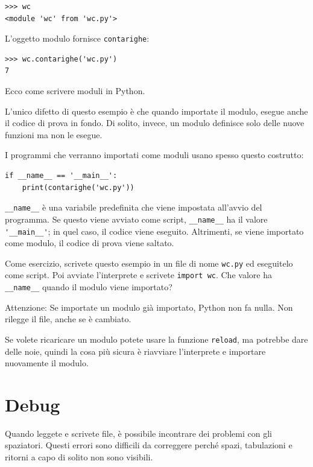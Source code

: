 \documentclass[10pt]{book}
\begin{document}
\begin{verbatim}
>>> wc
<module 'wc' from 'wc.py'>
\end{verbatim}
%
L'oggetto modulo fornisce \verb"contarighe":

\begin{verbatim}
>>> wc.contarighe('wc.py')
7
\end{verbatim}
%
Ecco come scrivere moduli in Python.

L'unico difetto di questo esempio è che quando importate il modulo, esegue anche il codice di prova in fondo. Di solito, invece, un modulo definisce solo delle nuove funzioni ma non le esegue.

I programmi che verranno importati come moduli usano spesso questo costrutto:

\begin{verbatim}
if __name__ == '__main__':
    print(contarighe('wc.py'))
\end{verbatim}
%
\verb"__name__" è una variabile predefinita che viene impostata all'avvio del programma. Se questo viene avviato come script,
\verb"__name__" ha il valore \verb"'__main__'"; in quel caso, il codice viene eseguito. Altrimenti, se viene importato come modulo, il codice di prova viene saltato.

Come esercizio, scrivete questo esempio in un file di nome {\tt wc.py} ed eseguitelo come script. Poi avviate l'interprete e scrivete
{\tt import wc}.  Che valore ha \verb"__name__"
quando il modulo viene importato?

Attenzione: Se importate un modulo già importato, Python non fa nulla. Non rilegge il file, anche se è cambiato.

Se volete ricaricare un modulo potete usare la funzione {\tt reload}, ma potrebbe dare delle noie, quindi la cosa più sicura è riavviare l'interprete e importare nuovamente il modulo.


\section{Debug}

Quando leggete e scrivete file, è possibile incontrare dei problemi con gli spaziatori. Questi errori sono difficili da correggere perché spazi, tabulazioni e ritorni a capo di solito non sono visibili.
\end{document}
